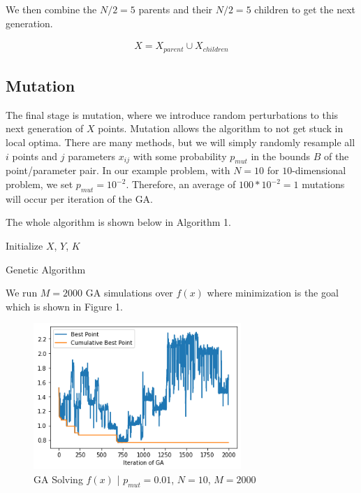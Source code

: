 \documentclass[12pt]{article}
\begin{document}
\vspace{5mm}

We then combine the $N/2=5$ parents and their $N/2=5$ children to get the next generation.

\begin{align*}
X=X_{parent} \cup X_{children}
\end{align*}

\subsection{Mutation}

The final stage is mutation, where we introduce random perturbations to this next generation of $X$ points. Mutation allows the algorithm to not get stuck in local optima. There are many methods, but we will simply randomly resample all $i$ points and $j$ parameters $x_{ij}$ with some probability $p_{mut}$ in the bounds $B$ of the point/parameter pair. In our example problem, with $N=10$ for $10$-dimensional problem, we set $p_{mut}=10^{-2}$. Therefore, an average of $100*10^{-2}=1$ mutations will occur per iteration of the GA.

\vspace{5mm}

The whole algorithm is shown below in Algorithm 1.

\begin{algorithm}[h]
Initialize $X$, $Y$, $K$ \;
\caption{Genetic Algorithm}
\end{algorithm}

\vspace{5mm}

We run $M=2000$ GA simulations over $f(x)$ where minimization is the goal which is shown in Figure 1.
 
\begin{figure}[h]
\centering
\includegraphics[width=0.7\textwidth]{Post_11_ga1}
\caption{GA Solving $f(x)$ | $p_{mut}=0.01$, $N=10$, $M=2000$}
\end{figure}
\end{document}
